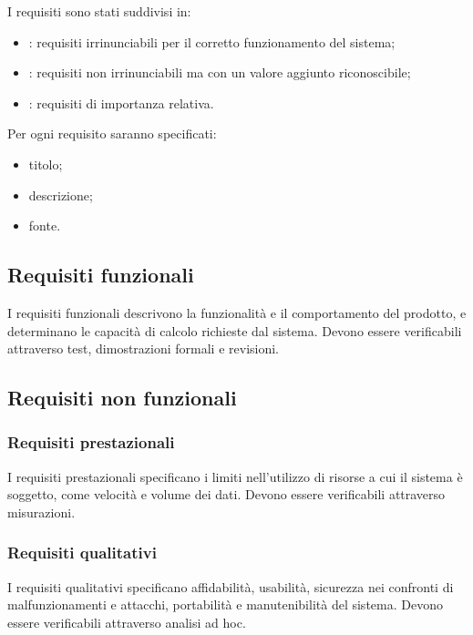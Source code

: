 \documentclass[a4paper, titlepage]{article}
\begin{document}
\bigskip

I requisiti sono stati suddivisi in:
\begin{itemize}
\item {}: requisiti irrinunciabili per il corretto funzionamento del sistema;
\item {}: requisiti non irrinunciabili ma con un valore aggiunto riconoscibile;
\item {}: requisiti di importanza relativa.
\end{itemize}

\bigskip

Per ogni requisito saranno specificati:
\begin{itemize}
\item titolo;
\item descrizione;
\item fonte.
\end{itemize}

\subsection{Requisiti funzionali}
I requisiti funzionali descrivono la funzionalità e il comportamento del prodotto, e determinano le capacità di calcolo richieste dal sistema. Devono essere verificabili attraverso test, dimostrazioni formali e revisioni.



\subsection{Requisiti non funzionali}
\subsubsection{Requisiti prestazionali}
I requisiti prestazionali specificano i limiti nell'utilizzo di risorse a cui il sistema è soggetto, come velocità e volume dei dati. Devono essere verificabili attraverso misurazioni.



\subsubsection{Requisiti qualitativi}
I requisiti qualitativi specificano affidabilità, usabilità, sicurezza nei confronti di malfunzionamenti e attacchi, portabilità e manutenibilità del sistema. Devono essere verificabili attraverso analisi ad hoc.
\end{document}

